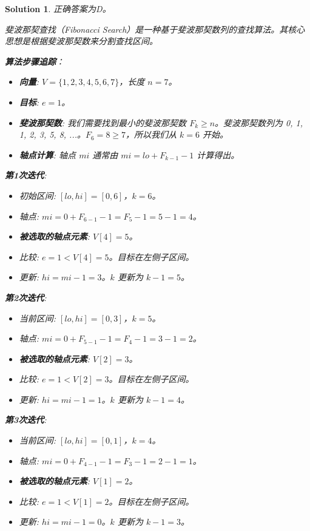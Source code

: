 \documentclass[UTF8]{report}
\newtheorem{solution}{Solution}
\theoremstyle{MyLineTheoremStyle} %
\theoremstyle{MyBlockTheoremStyle} %
\theoremstyle{MySubsubsectionStyle} %
\begin{document}
\begin{solution}
正确答案为D。

斐波那契查找（Fibonacci Search）是一种基于斐波那契数列的查找算法。其核心思想是根据斐波那契数来分割查找区间。

\textbf{算法步骤追踪}：
\begin{itemize}
    \item \textbf{向量}: $V = \{1, 2, 3, 4, 5, 6, 7\}$，长度 $n=7$。
    \item \textbf{目标}: $e = 1$。
    \item \textbf{斐波那契数}: 我们需要找到最小的斐波那契数 $F_k \ge n$。斐波那契数列为 0, 1, 1, 2, 3, 5, 8, ...。$F_6 = 8 \ge 7$，所以我们从 $k=6$ 开始。
    \item \textbf{轴点计算}: 轴点 $mi$ 通常由 $mi = lo + F_{k-1} - 1$ 计算得出。
\end{itemize}

\textbf{第1次迭代}:
\begin{itemize}
    \item 初始区间: $[lo, hi] = [0, 6]$，$k=6$。
    \item 轴点: $mi = 0 + F_{6-1} - 1 = F_5 - 1 = 5 - 1 = 4$。
    \item \textbf{被选取的轴点元素}: $V[4] = 5$。
    \item 比较: $e=1 < V[4]=5$。目标在左侧子区间。
    \item 更新: $hi = mi - 1 = 3$。$k$ 更新为 $k-1=5$。
\end{itemize}

\textbf{第2次迭代}:
\begin{itemize}
    \item 当前区间: $[lo, hi] = [0, 3]$，$k=5$。
    \item 轴点: $mi = 0 + F_{5-1} - 1 = F_4 - 1 = 3 - 1 = 2$。
    \item \textbf{被选取的轴点元素}: $V[2] = 3$。
    \item 比较: $e=1 < V[2]=3$。目标在左侧子区间。
    \item 更新: $hi = mi - 1 = 1$。$k$ 更新为 $k-1=4$。
\end{itemize}

\textbf{第3次迭代}:
\begin{itemize}
    \item 当前区间: $[lo, hi] = [0, 1]$，$k=4$。
    \item 轴点: $mi = 0 + F_{4-1} - 1 = F_3 - 1 = 2 - 1 = 1$。
    \item \textbf{被选取的轴点元素}: $V[1] = 2$。
    \item 比较: $e=1 < V[1]=2$。目标在左侧子区间。
    \item 更新: $hi = mi - 1 = 0$。$k$ 更新为 $k-1=3$。
\end{itemize}


\end{solution}
\end{document}
